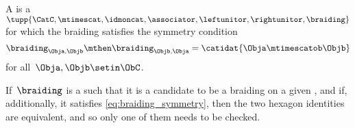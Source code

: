 \begin{ctdefinition}
    \label{def:sym-mon-cat}
    A  is a  $\tupp{\CatC, {{\mtimescat}}, \idmoncat, \associator, \leftunitor, \rightunitor, \braiding}$ for which the braiding satisfies the symmetry condition
    \begin{equation}
        \label{eq:braiding-symmetry}
        \braiding_{\Obja,\Objb} \mthen \braiding_{\Objb,\Obja} = \catidat{\Obja \mtimescatob \Objb}
    \end{equation}
    for all~$\Obja, \Objb \setin \ObC$.
\end{ctdefinition}

\begin{remark}
    If~$\braiding$ is a  such that it is a candidate to be a braiding on a given , and if, additionally, it satisfies \cref{eq:braiding_symmetry}, then the two hexagon identities are equivalent, and so only one of them needs to be checked.
\end{remark}
